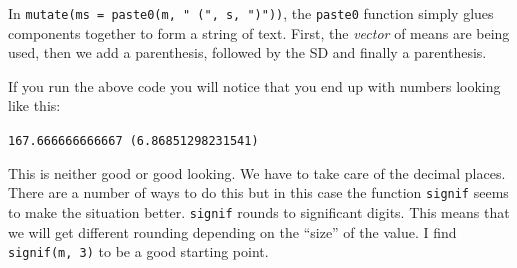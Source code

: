 \documentclass[
  11pt,
  letterpaper,
]{scrbook}
\begin{document}
In \texttt{mutate(ms\ =\ paste0(m,\ "\ (",\ s,\ ")"))}, the
\texttt{paste0} function simply glues components together to form a
string of text. First, the \emph{vector} of means are being used, then
we add a parenthesis, followed by the SD and finally a parenthesis.

If you run the above code you will notice that you end up with numbers
looking like this:

\texttt{167.666666666667\ (6.86851298231541)}

This is neither good or good looking. We have to take care of the
decimal places. There are a number of ways to do this but in this case
the function \texttt{signif} seems to make the situation better.
\texttt{signif} rounds to significant digits. This means that we will
get different rounding depending on the ``size'' of the value. I find
\texttt{signif(m,\ 3)} to be a good starting point.
\end{document}
